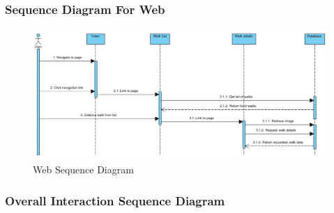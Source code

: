 \documentclass[12pt]{article}
\begin{document}
\subsubsection{Sequence Diagram For Web}
\begin{figure}[htp]
\begin{adjustwidth}{-2cm}{0cm}
\centering
\includegraphics[scale=0.70]{Design/web_sequence_diagram.PNG}
\caption{Web Sequence Diagram}
\label{Web Sequence Diagram}
\end{adjustwidth}
\end{figure}
\subsubsection{Overall Interaction Sequence Diagram}
\end{document}
